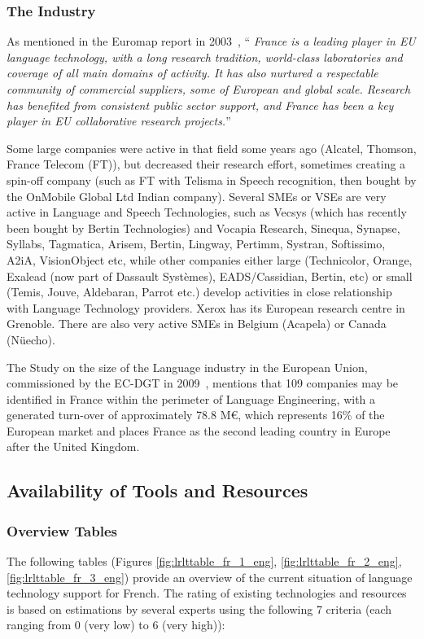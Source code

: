 \begin{multicols}{2}
\subsubsection{The Industry}

As mentioned in the Euromap report in 2003~\cite{euromap}, ``{\em
  France is a leading player in EU language technology, with a long
  research tradition, world-class laboratories and coverage of all
  main domains of activity. It has also nurtured a respectable
  community of commercial suppliers, some of European and global
  scale. Research has benefited from consistent public sector support,
  and France has been a key player in EU collaborative research
  projects.}''

Some large companies were active in that field some years ago
(Alcatel, Thomson, France Telecom (FT)), but decreased their research
effort, sometimes creating a spin-off company (such as FT with Telisma
in Speech recognition, then bought by the OnMobile Global Ltd Indian
company). Several SMEs or VSEs are very active in Language and Speech
Technologies, such as Vecsys (which has recently been bought by Bertin
Technologies) and Vocapia Research, Sinequa, Synapse, Syllabs,
Tagmatica, Arisem, Bertin, Lingway, Pertimm, Systran, Softissimo,
A2iA, VisionObject etc, while other companies either large
(Technicolor, Orange, Exalead (now part of Dassault Systèmes),
EADS/Cassidian, Bertin, etc) or small (Temis, Jouve, Aldebaran, Parrot
etc.) develop activities in close relationship with Language
Technology providers. Xerox has its European research centre in
Grenoble. There are also very active SMEs in Belgium (Acapela) or
Canada (Nüecho).

The Study on the size of the Language industry in the European Union,
commissioned by the EC-DGT in 2009~\cite{dgt08}, mentions that 109 companies may
be identified in France within the perimeter of Language Engineering,
with a generated turn-over of approximately 78.8 M€, which represents
16\% of the European market and places France as the second leading
country in Europe after the United Kingdom.

\subsection{Availability of Tools and Resources}

\subsubsection{Overview Tables}
The following tables (Figures \ref{fig:lrlttable_fr_1_eng}, \ref{fig:lrlttable_fr_2_eng}, \ref{fig:lrlttable_fr_3_eng}) provide an overview of the current situation of
language technology support for French. The rating of existing
technologies and resources is based on estimations by several experts
using the following 7 criteria (each ranging from 0 (very low) to 6
(very high)):


\end{multicols}
